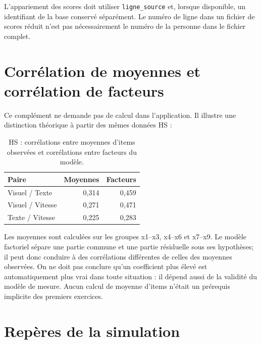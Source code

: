 \documentclass[
  french,
  11pt,
  a4paper,
  DIV=11,
  numbers=noendperiod]{scrreprt}
\begin{document}
L'appariement des scores doit utiliser \texttt{ligne\_source} et,
lorsque disponible, un identifiant de la base conservé séparément. Le
numéro de ligne dans un fichier de scores réduit n'est pas
nécessairement le numéro de la personne dans le fichier complet.

\section{Corrélation de moyennes et corrélation de
facteurs}\label{corruxe9lation-de-moyennes-et-corruxe9lation-de-facteurs}

Ce complément ne demande pas de calcul dans l'application. Il illustre
une distinction théorique à partir des mêmes données HS :


{

\begin{longtable}[]{@{}lrr@{}}

\caption{\label{tbl-moyennes}HS : corrélations entre moyennes d'items
observées et corrélations entre facteurs du modèle.}

\tabularnewline

\toprule\noalign{}
Paire & Moyennes & Facteurs \\
\midrule\noalign{}
\endhead
\bottomrule\noalign{}
\endlastfoot
Visuel / Texte & 0,314 & 0,459 \\
Visuel / Vitesse & 0,271 & 0,471 \\
Texte / Vitesse & 0,225 & 0,283 \\

\end{longtable}

}

Les moyennes sont calculées sur les groupes x1--x3, x4--x6 et x7--x9. Le
modèle factoriel sépare une partie commune et une partie résiduelle sous
ses hypothèses; il peut donc conduire à des corrélations différentes de
celles des moyennes observées. On ne doit pas conclure qu'un coefficient
plus élevé est automatiquement plus vrai dans toute situation : il
dépend aussi de la validité du modèle de mesure. Aucun calcul de moyenne
d'items n'était un prérequis implicite des premiers exercices.

\section{Repères de la simulation}\label{repuxe8res-de-la-simulation}
\end{document}
